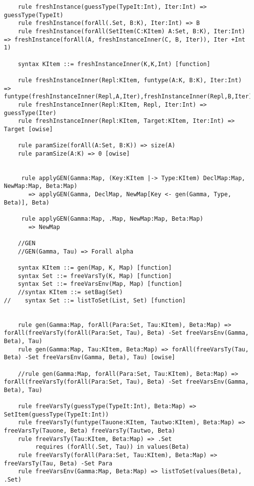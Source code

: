\begin{lstlisting}
    rule freshInstance(guessType(TypeIt:Int), Iter:Int) => guessType(TypeIt)
    rule freshInstance(forAll(.Set, B:K), Iter:Int) => B
    rule freshInstance(forAll(SetItem(C:KItem) A:Set, B:K), Iter:Int) => freshInstance(forAll(A, freshInstanceInner(C, B, Iter)), Iter +Int 1)

    syntax KItem ::= freshInstanceInner(K,K,Int) [function]

    rule freshInstanceInner(Repl:KItem, funtype(A:K, B:K), Iter:Int) => funtype(freshInstanceInner(Repl,A,Iter),freshInstanceInner(Repl,B,Iter))
    rule freshInstanceInner(Repl:KItem, Repl, Iter:Int) => guessType(Iter)
    rule freshInstanceInner(Repl:KItem, Target:KItem, Iter:Int) => Target [owise]

    rule paramSize(forAll(A:Set, B:K)) => size(A)
    rule paramSize(A:K) => 0 [owise]


     rule applyGEN(Gamma:Map, (Key:KItem |-> Type:KItem) DeclMap:Map, NewMap:Map, Beta:Map)
       => applyGEN(Gamma, DeclMap, NewMap[Key <- gen(Gamma, Type, Beta)], Beta)

     rule applyGEN(Gamma:Map, .Map, NewMap:Map, Beta:Map)
       => NewMap

    //GEN
    //GEN(Gamma, Tau) => Forall alpha

    syntax KItem ::= gen(Map, K, Map) [function]
    syntax Set ::= freeVarsTy(K, Map) [function]
    syntax Set ::= freeVarsEnv(Map, Map) [function]
    //syntax KItem ::= setBag(Set)
//    syntax Set ::= listToSet(List, Set) [function]


    rule gen(Gamma:Map, forAll(Para:Set, Tau:KItem), Beta:Map) => forAll(freeVarsTy(forAll(Para:Set, Tau), Beta) -Set freeVarsEnv(Gamma, Beta), Tau)
    rule gen(Gamma:Map, Tau:KItem, Beta:Map) => forAll(freeVarsTy(Tau, Beta) -Set freeVarsEnv(Gamma, Beta), Tau) [owise]

    //rule gen(Gamma:Map, forAll(Para:Set, Tau:KItem), Beta:Map) => forAll(freeVarsTy(forAll(Para:Set, Tau), Beta) -Set freeVarsEnv(Gamma, Beta), Tau)

    rule freeVarsTy(guessType(TypeIt:Int), Beta:Map) => SetItem(guessType(TypeIt:Int))
    rule freeVarsTy(funtype(Tauone:KItem, Tautwo:KItem), Beta:Map) => freeVarsTy(Tauone, Beta) freeVarsTy(Tautwo, Beta)
    rule freeVarsTy(Tau:KItem, Beta:Map) => .Set
         requires (forAll(.Set, Tau)) in values(Beta)
    rule freeVarsTy(forAll(Para:Set, Tau:KItem), Beta:Map) => freeVarsTy(Tau, Beta) -Set Para
    rule freeVarsEnv(Gamma:Map, Beta:Map) => listToSet(values(Beta), .Set)



\end{lstlisting}
